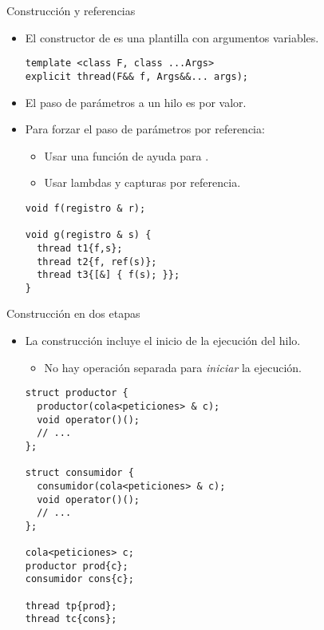 \begin{frame}[fragile]{Construcción y referencias}
\begin{itemize}
  \item El constructor de  es una plantilla con argumentos variables.
\begin{lstlisting}
template <class F, class ...Args> 
explicit thread(F&& f, Args&&... args);
\end{lstlisting}
  \item El paso de parámetros a un hilo es por valor.
  \item Para forzar el paso de parámetros por referencia:
    \begin{itemize}
      \item Usar una función de ayuda para .
      \item Usar lambdas y capturas por referencia.
    \end{itemize}
\begin{lstlisting}
void f(registro & r);

void g(registro & s) {
  thread t1{f,s};
  thread t2{f, ref(s)};
  thread t3{[&] { f(s); }};
}
\end{lstlisting}
\end{itemize}
\end{frame}

\begin{frame}[fragile]{Construcción en dos etapas}
\begin{itemize}
  \item La construcción incluye el inicio de la ejecución del hilo.
    \begin{itemize}
      \item No hay operación separada para \emph{iniciar} la ejecución.
    \end{itemize}
\begin{lstlisting}
struct productor {
  productor(cola<peticiones> & c);
  void operator()();
  // ...
};

struct consumidor {
  consumidor(cola<peticiones> & c);
  void operator()();
  // ...
};

cola<peticiones> c;
productor prod{c};
consumidor cons{c};

thread tp{prod};
thread tc{cons};
\end{lstlisting}
\end{itemize}
\end{frame}


